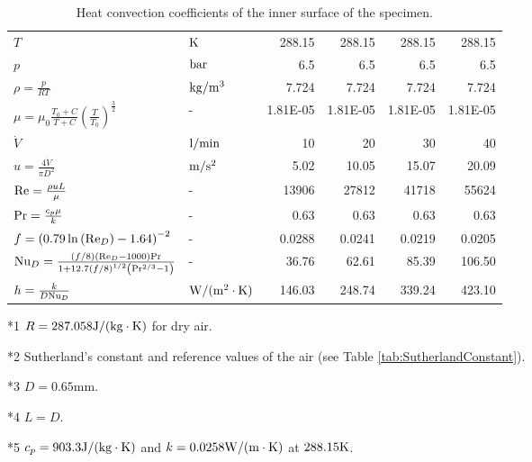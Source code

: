 \begin{table}[htbp]
  \begin{threeparttable}
  \centering
  \caption{Heat convection coefficients of the inner surface of the specimen.}
    \begin{tabular}{llrrrr}
    \toprule
    $T$   & ${\rm{K}}$ & 288.15  & 288.15  & 288.15  & 288.15  \\
    $p$   & ${\rm{bar}}$ & 6.5   & 6.5   & 6.5   & 6.5  \\
    $\rho  = \frac{p}{{RT}}$ \tnote{*1} & ${\rm{kg/}}{{\rm{m}}^{\rm{3}}}$ & 7.724 & 7.724 & 7.724 & 7.724 \\
    $\mu  = {\mu _0}\frac{{{T_0} + C}}{{T + C}}{\left( {\frac{T}{{{T_0}}}} \right)^{\frac{3}{2}}}$ \tnote{*2} & -     & 1.81E-05 & 1.81E-05 & 1.81E-05 & 1.81E-05 \\
    ${\dot V}$ & ${\rm{l/min}}$ & 10    & 20    & 30    & 40  \\
    $u = \frac{{4\dot V}}{{\pi {D^2}}}$ \tnote{*3} & ${\rm{m/}}{{\rm{s}}^2}$ & 5.02  & 10.05  & 15.07  & 20.09  \\
    ${\rm{Re}} = \frac{{\rho uL}}{\mu }$ \tnote{*4} & -     & 13906  & 27812  & 41718  & 55624  \\
    ${\rm{Pr}} = \frac{{{c_p}\mu }}{k}$ \tnote{*5} & -     & 0.63  & 0.63  & 0.63  & 0.63  \\
    $f = {\left( {0.79\ln \left( {{\rm{R}}{{\rm{e}}_D}} \right) - 1.64} \right)^{ - 2}}$ & -     & 0.0288  & 0.0241  & 0.0219  & 0.0205  \\
    ${\rm{N}}{{\rm{u}}_D} = \frac{{\left( {f/8} \right)\left( {{\rm{R}}{{\rm{e}}_D} - 1000} \right){\rm{Pr}}}}{{1 + 12.7{{(f/8)}^{1/2}}\left( {{\rm{P}}{{\rm{r}}^{2/3}} - 1} \right)}}$ & -     & 36.76  & 62.61  & 85.39  & 106.50  \\
    $h = \frac{k}{{D{\rm{N}}{{\rm{u}}_D}}}$ & ${\rm{W/(}}{{\rm{m}}^{\rm{2}}} \cdot {\rm{K)}}$ & 146.03  & 248.74  & 339.24  & 423.10  \\
    \bottomrule
    \end{tabular}%
    \begin{tablenotes}
    \item[*1] $R = 287.058 {\rm{J/(kg}} \cdot {\rm{K}})$ for dry air.
    \item[*2] Sutherland's constant and reference values of the air (see Table \ref{tab:SutherlandConstant}).
    \item[*3] $D=0.65$mm.
    \item[*4] $L=D$.
    \item[*5] $c_{p}=903.3 {\rm{J/(kg}} \cdot {\rm{K}})$ and $k=0.0258 {\rm{W/(m}} \cdot {\rm{K}})$ at $288.15{\rm{K}}$.
    \end{tablenotes}
    \end{threeparttable}
  \label{tab:addlabel}%
\end{table}%





